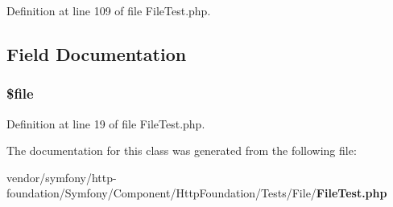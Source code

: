 Definition at line 109 of file File\+Test.\+php.



\subsection{Field Documentation}
\subsubsection[{\$file}]{\setlength{\rightskip}{0pt plus 5cm}\$file\hspace{0.3cm}{\ttfamily [protected]}}\label{class_symfony_1_1_component_1_1_http_foundation_1_1_tests_1_1_file_1_1_file_test_aa1bfbd27060176201b271918dff57e8f}


Definition at line 19 of file File\+Test.\+php.



The documentation for this class was generated from the following file\+:\begin{DoxyCompactItemize}
\item 
vendor/symfony/http-\/foundation/\+Symfony/\+Component/\+Http\+Foundation/\+Tests/\+File/{\bf File\+Test.\+php}\end{DoxyCompactItemize}
